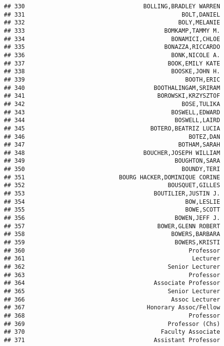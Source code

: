 \documentclass[
]{article}
\begin{document}
\begin{verbatim}
## 330                                  BOLLING,BRADLEY WARREN
## 331                                             BOLT,DANIEL
## 332                                            BOLY,MELANIE
## 333                                        BOMKAMP,TAMMY M.
## 334                                          BONAMICI,CHLOE
## 335                                        BONAZZA,RICCARDO
## 336                                          BONK,NICOLE A.
## 337                                         BOOK,EMILY KATE
## 338                                          BOOSKE,JOHN H.
## 339                                              BOOTH,ERIC
## 340                                     BOOTHALINGAM,SRIRAM
## 341                                      BOROWSKI,KRZYSZTOF
## 342                                             BOSE,TULIKA
## 343                                          BOSWELL,EDWARD
## 344                                           BOSWELL,LAIRD
## 345                                    BOTERO,BEATRIZ LUCIA
## 346                                               BOTEZ,DAN
## 347                                            BOTHAM,SARAH
## 348                                  BOUCHER,JOSEPH WILLIAM
## 349                                           BOUGHTON,SARA
## 350                                             BOUNDY,TERI
## 351                           BOURG HACKER,DOMINIQUE CORINE
## 352                                         BOUSQUET,GILLES
## 353                                     BOUTILIER,JUSTIN J.
## 354                                              BOW,LESLIE
## 355                                              BOWE,SCOTT
## 356                                           BOWEN,JEFF J.
## 357                                      BOWER,GLENN ROBERT
## 358                                          BOWERS,BARBARA
## 359                                           BOWERS,KRISTI
## 360                                               Professor
## 361                                                Lecturer
## 362                                         Senior Lecturer
## 363                                               Professor
## 364                                     Associate Professor
## 365                                         Senior Lecturer
## 366                                          Assoc Lecturer
## 367                                   Honorary Assoc/Fellow
## 368                                               Professor
## 369                                         Professor (Chs)
## 370                                       Faculty Associate
## 371                                     Assistant Professor

\end{verbatim}
\end{document}
